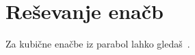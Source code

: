 \section{Reševanje enačb}
\label{pogl:enacbe}


Za kubične enačbe iz parabol lahko gledaš~\cite[str.\ 150]{geometricconstructions}.
